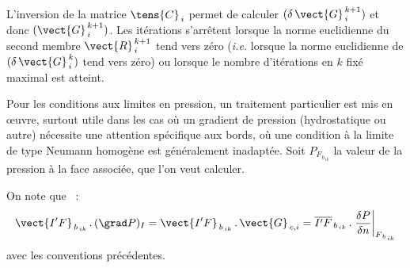 L'inversion de la matrice $\tens{C}_{\,i}$ permet de calculer
$(\delta\,\vect{G}^{\,k+1}_{\,i})$ et donc $(\vect{G}^{\,k+1}_{\,i})$. Les
it\'erations s'arr\^etent lorsque la norme euclidienne du second membre
$\vect{R}^{\,k+1}_{\,i}$ tend vers z\'ero ({\it i.e.} lorsque la norme
euclidienne  de
$(\delta\,\vect{G}^{\,k}_{\,i})$ tend vers z\'ero) ou lorsque le nombre
d'it\'erations en $k$ fix\'e maximal est atteint.

Pour les conditions aux limites en pression, un traitement particulier est mis
en  \oe uvre, surtout utile dans les cas o\`u un gradient de pression (hydrostatique
ou autre) n\'ecessite une attention sp\'ecifique aux bords, o\`u une condition
\`a la limite de type Neumann homog\`ene est g\'en\'eralement inadapt\'ee. Soit
$P_{F_{\,b_{\,ik}}}$ la  valeur de la pression \`a la face associ\'ee, que
l'on veut calculer.

On note que ~:
\begin{equation}\notag
\vect{I'F}_{\,b_{\,ik}} \,.\,(\grad P)_I = \vect{I'F}_{\,b_{\,ik}}
\,.\,\vect{G}_{\,c,i} = \overline{I'F}_{\,b_{\,ik}} \,.\left. \displaystyle\frac{\delta P}{\delta
n}\right|_{F_{\,b_{\,ik}}}
\end{equation}
avec les conventions pr\'ec\'edentes.\\
